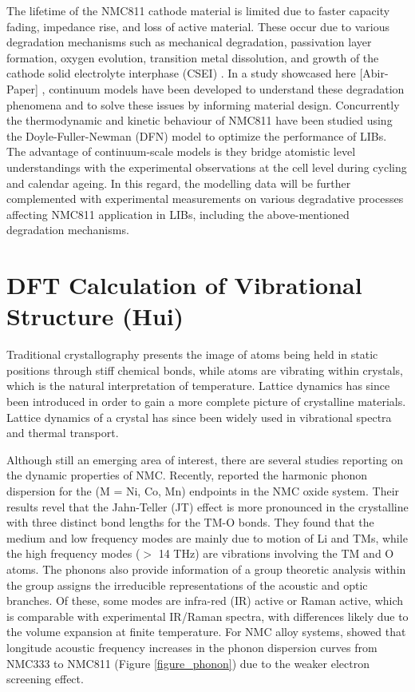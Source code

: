 \documentclass[aps,prb,twocolumn,superscriptaddress,reprint]{revtex4-1}
\begin{document}
The lifetime of the NMC811 cathode material is limited due to faster capacity fading, impedance rise, and loss of active material. These occur due to various degradation mechanisms such as mechanical degradation, passivation layer formation, oxygen evolution, transition metal dissolution, and growth of the cathode solid electrolyte interphase (CSEI) \cite{Li2019degra}. In a study showcased here [Abir-Paper] \cite{}, continuum models have been developed to understand these degradation phenomena and to solve these issues by informing material design. Concurrently the thermodynamic and kinetic behaviour of NMC811 have been studied using the Doyle-Fuller-Newman (DFN) model \cite{hui2020param} to optimize the performance of LIBs. The advantage of continuum-scale models is they bridge atomistic level understandings with the experimental observations at the cell level during cycling and calendar ageing. In this regard, the modelling data will be further complemented with experimental measurements on various degradative processes affecting NMC811 application in LIBs, including the above-mentioned degradation mechanisms.

\section{DFT Calculation of Vibrational Structure (Hui)}
Traditional crystallography presents the image of atoms being held in static positions through stiff chemical bonds, while atoms are vibrating within crystals, which is the natural interpretation of temperature. Lattice dynamics has since been introduced in order to gain a more complete picture of crystalline materials. Lattice dynamics of a crystal has since been widely used in vibrational spectra and thermal transport.

Although still an emerging area of interest, there are several studies reporting on the dynamic properties of NMC. Recently, \citeauthor{yang2020chemical} reported the harmonic phonon dispersion for the  (M = Ni, Co, Mn) endpoints in the NMC oxide system. \cite{yang2020chemical} Their results revel that the Jahn-Teller (JT) effect is more pronounced in the crystalline  with three distinct bond lengths for the TM-O bonds. They found that the medium and low frequency modes are mainly due to motion of Li and TMs, while the high frequency modes ($>$ 14 THz) are vibrations involving the TM and O atoms. The phonons also provide information of a group theoretic analysis within the group assigns the irreducible representations of the acoustic and optic branches. Of these, some modes are infra-red (IR) active or Raman active, which is comparable with experimental IR/Raman spectra, with differences likely due to the volume expansion at finite temperature. \cite{yang2019highly} For NMC alloy systems, \citeauthor{sun_electronic_2017} showed that longitude acoustic frequency increases in the phonon dispersion curves from NMC333 to NMC811 (Figure \ref{figure_phonon}) due to the weaker electron screening effect.\cite{sun_electronic_2017}
\end{document}
